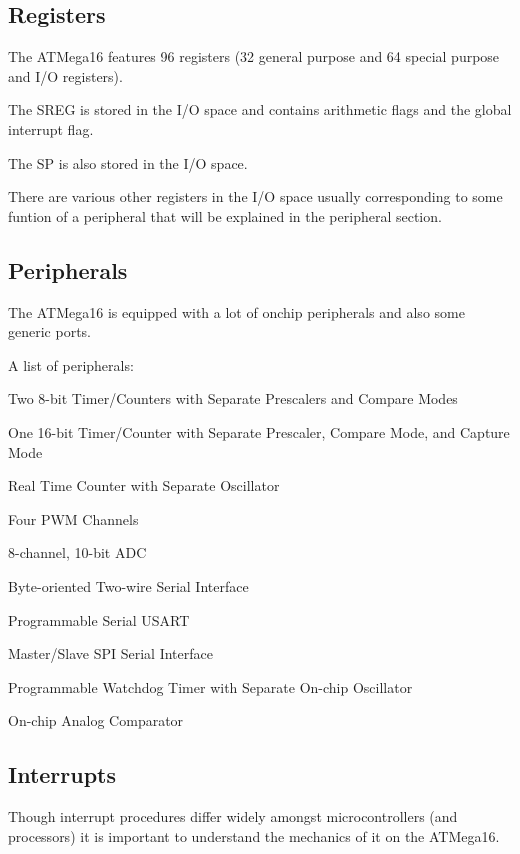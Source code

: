\subsection{Registers}

The ATMega16 features 96 registers (32 general purpose and 64 special 
purpose and I/O registers).

The \ac{SREG} is stored in the I/O space and contains arithmetic flags
and the global interrupt flag.

The \ac{SP} is also stored in the I/O space.

There are various other registers in the I/O space usually corresponding
to some funtion of a peripheral that will be explained in the peripheral
section. \cite[p.331]{ATMegaDS}

\subsection{Peripherals}

The ATMega16 is equipped with a lot of onchip peripherals and also some
generic ports.

A list of peripherals\cite[p.1]{ATMegaDS}:
\begin{description}
\item{Two 8-bit Timer/Counters with Separate Prescalers and Compare Modes} 
\item{One 16-bit Timer/Counter with Separate Prescaler, Compare Mode, and Capture Mode}
\item{Real Time Counter with Separate Oscillator}
\item{Four PWM Channels}
\item{8-channel, 10-bit ADC}
\item{Byte-oriented Two-wire Serial Interface}
\item{Programmable Serial USART}
\item{Master/Slave SPI Serial Interface}
\item{Programmable Watchdog Timer with Separate On-chip Oscillator}
\item{On-chip Analog Comparator}
\end{description}

\subsection{Interrupts}

Though interrupt procedures differ widely amongst microcontrollers (and processors)
it is important to understand the mechanics of it on the ATMega16. 

